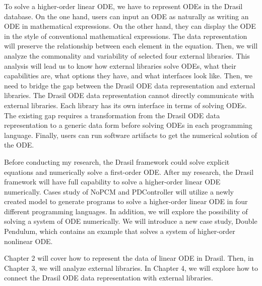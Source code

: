 To solve a higher-order linear ODE, we have to represent ODEs in the Drasil database. On the one hand, users can input an ODE as naturally as writing an ODE in mathematical expressions. On the other hand, they can display the ODE in the style of conventional mathematical expressions. The data representation will preserve the relationship between each element in the equation. Then, we will analyze the commonality and variability of selected four external libraries. This analysis will lead us to know how external libraries solve ODEs, what their capabilities are, what options they have, and what interfaces look like. Then, we need to bridge the gap between the Drasil ODE data representation and external libraries. The Drasil ODE data representation cannot directly communicate with external libraries. Each library has its own interface in terms of solving ODEs. The existing gap requires a transformation from the Drasil ODE data representation to a generic data form before solving ODEs in each programming language. Finally, users can run software artifacts to get the numerical solution of the ODE.

Before conducting my research, the Drasil framework could solve explicit equations and numerically solve a first-order ODE. After my research, the Drasil framework will have full capability to solve a higher-order linear ODE numerically. Cases study of NoPCM and PDController will utilize a newly created model to generate programs to solve a higher-order linear ODE in four different programming languages. In addition, we will explore the possibility of solving a system of ODE numerically. We will introduce a new case study, Double Pendulum, which contains an example that solves a system of higher-order nonlinear ODE.

Chapter 2 will cover how to represent the data of linear ODE in Drasil. Then, in Chapter 3, we will analyze external libraries. In Chapter 4, we will explore how to connect the Drasil ODE data representation with external libraries.
